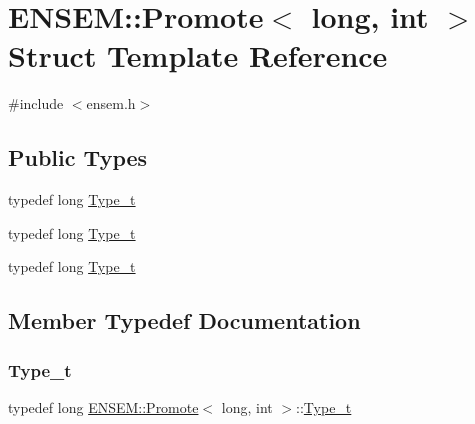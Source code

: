 \hypertarget{structENSEM_1_1Promote_3_01long_00_01int_01_4}{}\section{E\+N\+S\+EM\+:\+:Promote$<$ long, int $>$ Struct Template Reference}
\label{structENSEM_1_1Promote_3_01long_00_01int_01_4}


{\ttfamily \#include $<$ensem.\+h$>$}

\subsection*{Public Types}
\begin{DoxyCompactItemize}
\item 
typedef long \mbox{\hyperlink{structENSEM_1_1Promote_3_01long_00_01int_01_4_a98c4c916d9b142fd471add21a6769683}{Type\+\_\+t}}
\item 
typedef long \mbox{\hyperlink{structENSEM_1_1Promote_3_01long_00_01int_01_4_a98c4c916d9b142fd471add21a6769683}{Type\+\_\+t}}
\item 
typedef long \mbox{\hyperlink{structENSEM_1_1Promote_3_01long_00_01int_01_4_a98c4c916d9b142fd471add21a6769683}{Type\+\_\+t}}
\end{DoxyCompactItemize}


\subsection{Member Typedef Documentation}
\mbox{\label{structENSEM_1_1Promote_3_01long_00_01int_01_4_a98c4c916d9b142fd471add21a6769683}} 
\subsubsection{\texorpdfstring{Type\_t}{Type\_t}\hspace{0.1cm}{\footnotesize\ttfamily [1/3]}}
{\footnotesize\ttfamily typedef long \mbox{\hyperlink{structENSEM_1_1Promote}{E\+N\+S\+E\+M\+::\+Promote}}$<$ long, int $>$\+::\mbox{\hyperlink{structENSEM_1_1Promote_3_01long_00_01int_01_4_a98c4c916d9b142fd471add21a6769683}{Type\+\_\+t}}}

\mbox{\label{structENSEM_1_1Promote_3_01long_00_01int_01_4_a98c4c916d9b142fd471add21a6769683}} 
